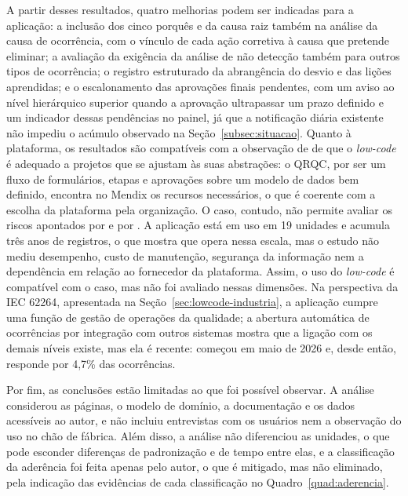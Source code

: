 A partir desses resultados, quatro melhorias podem ser indicadas para a aplicação: a inclusão dos cinco porquês e da causa raiz também na análise da causa de ocorrência, com o vínculo de cada ação corretiva à causa que pretende eliminar; a avaliação da exigência da análise de não detecção também para outros tipos de ocorrência; o registro estruturado da abrangência do desvio e das lições aprendidas; e o escalonamento das aprovações finais pendentes, com um aviso ao nível hierárquico superior quando a aprovação ultrapassar um prazo definido e um indicador dessas pendências no painel, já que a notificação diária existente não impediu o acúmulo observado na Seção~\ref{subsec:situacao}. Quanto à plataforma, os resultados são compatíveis com a observação de  de que o \textit{low-code} é adequado a projetos que se ajustam às suas abstrações: o QRQC, por ser um fluxo de formulários, etapas e aprovações sobre um modelo de dados bem definido, encontra no Mendix os recursos necessários, o que é coerente com a escolha da plataforma pela organização. O caso, contudo, não permite avaliar os riscos apontados por  e por . A aplicação está em uso em 19 unidades e acumula três anos de registros, o que mostra que opera nessa escala, mas o estudo não mediu desempenho, custo de manutenção, segurança da informação nem a dependência em relação ao fornecedor da plataforma. Assim, o uso do \textit{low-code} é compatível com o caso, mas não foi avaliado nessas dimensões. Na perspectiva da IEC 62264, apresentada na Seção~\ref{sec:lowcode-industria}, a aplicação cumpre uma função de gestão de operações da qualidade; a abertura automática de ocorrências por integração com outros sistemas mostra que a ligação com os demais níveis existe, mas ela é recente: começou em maio de 2026 e, desde então, responde por 4,7\% das ocorrências.

Por fim, as conclusões estão limitadas ao que foi possível observar. A análise considerou as páginas, o modelo de domínio, a documentação e os dados acessíveis ao autor, e não incluiu entrevistas com os usuários nem a observação do uso no chão de fábrica. Além disso, a análise não diferenciou as unidades, o que pode esconder diferenças de padronização e de tempo entre elas, e a classificação da aderência foi feita apenas pelo autor, o que é mitigado, mas não eliminado, pela indicação das evidências de cada classificação no Quadro~\ref{quad:aderencia}.
